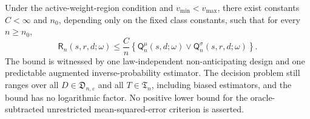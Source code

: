 Under the active-weight-region condition and \(v_{\min}<v_{\max}\), there exist constants \(C<\infty\) and \(n_0\), depending only on the fixed class constants, such that for every \(n\geq n_0\),
\[
\mathsf R_n(s,r,d;\omega)
\leq \frac{C}{n}\left\{\mathsf Q_n^{\mu}(s,d;\omega)\vee
\mathsf Q_n^{\sigma}(s,r,d;\omega)\right\}.
\]
The bound is witnessed by one law-independent non-anticipating design and one predictable augmented inverse-probability estimator.  The decision problem still ranges over all \(D\in\mathfrak D_{n,\varepsilon}\) and all \(T\in\mathfrak T_n\), including biased estimators, and the bound has no logarithmic factor.  No positive lower bound for the oracle-subtracted unrestricted mean-squared-error criterion is asserted.